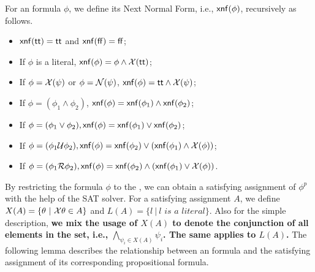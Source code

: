 \begin{definition}\label{def:xnf}
For an \ltlf formula $\phi$, we define its Next Normal Form, i.e., ${\sf xnf}(\phi)$, recursively as follows. 
\begin{itemize}
\item ${\sf xnf}({\sf tt}) = {\sf tt}$ and ${\sf xnf}({\sf ff}) = {\sf ff}$;
\item If $\phi$ is a literal, ${\sf xnf}(\phi) = \phi \wedge \mathcal{X}({\sf tt})$;
\item If $\phi = \mathcal{X}(\psi)$ or $\phi = \mathcal{N}(\psi)$, ${\sf xnf}(\phi) = {\sf tt} \wedge \mathcal{X}(\psi)$;
\item If $\phi = (\phi_1 \wedge \phi_2)$, ${\sf xnf}(\phi) = {\sf xnf}(\phi_1)\wedge{\sf xnf}(\phi_2)$;
\item If $\phi = (\phi_1 \vee \phi_2), {\sf xnf}(\phi) = {\sf xnf}(\phi_1)\vee {\sf xnf}(\phi_2)$; 
\item If $\phi = (\phi_1 \mathcal{U} \phi_2), {\sf xnf}(\phi) = {\sf xnf}(\phi_2) \vee ({\sf xnf}(\phi_1) \wedge \mathcal{X}(\phi))$; 
\item If $\phi = (\phi_1 \mathcal{R} \phi_2), {\sf xnf}(\phi) = {\sf xnf}(\phi_2)\wedge ({\sf xnf}(\phi_1) \vee \mathcal{X}(\phi))$.
\end{itemize}
\end{definition}

By restricting the \ltlf formula $\phi$ to the \XNF, we can obtain a satisfying assignment of $\phi^{p}$ with the help of the SAT solver.
For a satisfying assignment $A$, we define $X(A)=\{\theta\ |\ \mathcal{X}\theta\in A\}$ and $L(A) =\{l\ |\ l \textit{ is a literal}\}$. Also for the simple description, \textbf{we mix the usage of $X(A)$ to denote the conjunction of all elements in the set, i.e., $\bigwedge_{\psi_i\in X(A)}\psi_i$. The same applies to $L(A)$.}
The following lemma describes the relationship between an \ltlf formula and the satisfying assignment of its corresponding propositional formula.

